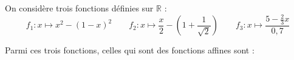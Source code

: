 
On considère trois fonctions définies sur $\mathbb{R}$ :
\[f_1: x \longmapsto x^2-(1-x)^2 \qquad f_2: x \longmapsto \frac{x}{2}-\left(1+\frac{1}{\sqrt{2}}\right) \qquad f_3: x \longmapsto \frac{5-\frac{2}{3}x}{0{,}7}\]

Parmi ces trois fonctions, celles qui sont des fonctions affines sont :

\smallskip

